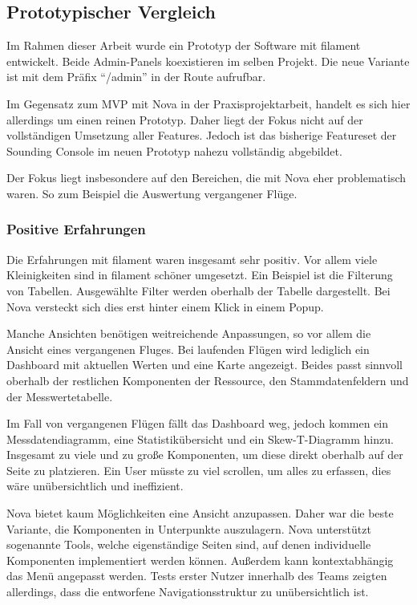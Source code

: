 \subsection{Prototypischer Vergleich}
Im Rahmen dieser Arbeit wurde ein Prototyp der Software mit filament entwickelt.
Beide Admin-Panels koexistieren im selben Projekt.
Die neue Variante ist mit dem Präfix \enquote{/admin} in der Route aufrufbar.

Im Gegensatz zum MVP mit Nova in der Praxisprojektarbeit, handelt es sich hier allerdings um einen reinen Prototyp.
Daher liegt der Fokus nicht auf der vollständigen Umsetzung aller Features.
Jedoch ist das bisherige Featureset der Sounding Console im neuen Prototyp nahezu vollständig abgebildet.

Der Fokus liegt insbesondere auf den Bereichen, die mit Nova eher problematisch waren.
So zum Beispiel die Auswertung vergangener Flüge.

\subsubsection{Positive Erfahrungen}
Die Erfahrungen mit filament waren insgesamt sehr positiv.
Vor allem viele Kleinigkeiten sind in filament schöner umgesetzt.
Ein Beispiel ist die Filterung von Tabellen.
Ausgewählte Filter werden oberhalb der Tabelle dargestellt.
Bei Nova versteckt sich dies erst hinter einem Klick in einem Popup.

Manche Ansichten benötigen weitreichende Anpassungen, so vor allem die Ansicht eines vergangenen Fluges.
Bei laufenden Flügen wird lediglich ein Dashboard mit aktuellen Werten und eine Karte angezeigt.
Beides passt sinnvoll oberhalb der restlichen Komponenten der Ressource, den Stammdatenfeldern und der Messwertetabelle.

Im Fall von vergangenen Flügen fällt das Dashboard weg, jedoch kommen ein Messdatendiagramm, eine Statistikübersicht und ein Skew-T-Diagramm hinzu.
Insgesamt zu viele und zu große Komponenten, um diese direkt oberhalb auf der Seite zu platzieren.
Ein User müsste zu viel scrollen, um alles zu erfassen, dies wäre unübersichtlich und ineffizient.

Nova bietet kaum Möglichkeiten eine Ansicht anzupassen.
Daher war die beste Variante, die Komponenten in Unterpunkte auszulagern.
Nova unterstützt sogenannte Tools, welche eigenständige Seiten sind, auf denen individuelle Komponenten implementiert werden können.
Außerdem kann kontextabhängig das Menü angepasst werden.
Tests erster Nutzer innerhalb des Teams zeigten allerdings, dass die entworfene Navigationsstruktur zu unübersichtlich ist.


